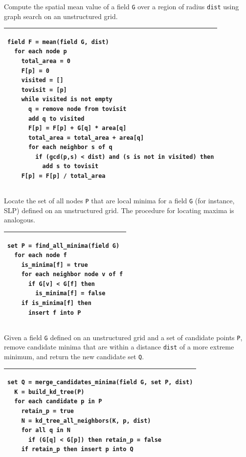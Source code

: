 \documentclass[gmdd, hvmath, online]{copernicus_discussions}
\begin{document}

\begin{algorithm}
\caption{Compute the spatial mean value of a field \texttt{G} over a region of radius \texttt{dist} using graph search on an unstructured grid.\ \\} \label{alg:field_mean_value}
\noindent \begin{tabular}{p{5in}}
\hline \small \begin{verbatim}
field F = mean(field G, dist)
  for each node p
    total_area = 0
    F[p] = 0
    visited = []
    tovisit = [p]
    while visited is not empty
      q = remove node from tovisit
      add q to visited
      F[p] = F[p] + G[q] * area[q]
      total_area = total_area + area[q]
      for each neighbor s of q
        if (gcd(p,s) < dist) and (s is not in visited) then
          add s to tovisit
    F[p] = F[p] / total_area
\end{verbatim} \\
\hline
\end{tabular}
\end{algorithm}

\begin{algorithm}
\caption{Locate the set of all nodes \texttt{P} that are local minima for a field \texttt{G} (for instance, SLP) defined on an unstructured grid.  The procedure for locating maxima is analogous.\ \\} \label{alg:find_all_minima}
\noindent \begin{tabular}{p{5in}}
\hline \small \begin{verbatim}
set P = find_all_minima(field G)
  for each node f
    is_minima[f] = true
    for each neighbor node v of f
      if G[v] < G[f] then
        is_minima[f] = false
    if is_minima[f] then
      insert f into P
\end{verbatim} \\
\hline
\end{tabular}
\end{algorithm}

\begin{algorithm}
\caption{Given a field \texttt{G} defined on an unstructured grid and a set of candidate points \texttt{P}, remove candidate minima that are within a distance \texttt{dist} of a more extreme minimum, and return the new candidate set \texttt{Q}.\ \\} \label{alg:merge_candidates_minima}
\noindent \begin{tabular}{p{5in}}
\hline \small \begin{verbatim}
set Q = merge_candidates_minima(field G, set P, dist)
  K = build_kd_tree(P)
  for each candidate p in P
    retain_p = true
    N = kd_tree_all_neighbors(K, p, dist)
    for all q in N
      if (G[q] < G[p]) then retain_p = false
    if retain_p then insert p into Q
\end{verbatim} \\
\hline
\end{tabular}
\end{algorithm}
\end{document}
